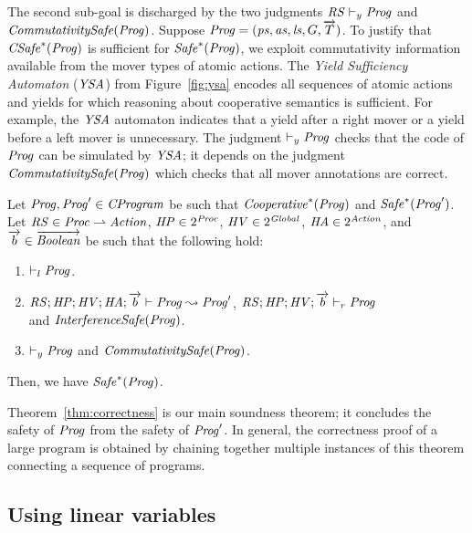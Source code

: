 The second sub-goal is discharged by the two judgments $\mathit{RS} \vdash_y \mathit{Prog}$ and $\mathit{CommutativitySafe}(\mathit{Prog})$.
Suppose $\mathit{Prog} = (\mathit{ps}, \mathit{as}, \mathit{ls}, G, \overrightarrow{T})$.
To justify that $\mathit{CSafe}^*(\mathit{Prog})$ is sufficient for $\mathit{Safe}^*(\mathit{Prog})$,
we exploit commutativity information available from the mover types of atomic actions.
The {\em Yield Sufficiency Automaton\/} ($\mathit{YSA}$) from Figure~\ref{fig:ysa} encodes 
all sequences of atomic actions and yields for which reasoning about cooperative semantics is sufficient.
For example, the $\mathit{YSA}$ automaton indicates that a yield after a right mover or a yield before a left mover is unnecessary.
The judgment $\vdash_y \mathit{Prog}$ checks that the code of $\mathit{Prog}$ can be simulated by $\mathit{YSA}$;
it depends on the judgment $\mathit{CommutativitySafe}(\mathit{Prog})$ which checks that all mover annotations are correct.

\begin{theorem}
\label{thm:correctness}
Let $\mathit{Prog},\mathit{Prog}' \in \mathit{CProgram}$ be such that $\mathit{Cooperative}^*(\mathit{Prog})$ and $\mathit{Safe}^*(\mathit{Prog}')$.
Let $\mathit{RS} \in \mathit{Proc} \rightharpoonup \mathit{Action}$, $\mathit{HP} \in 2^{\mathit{Proc}}$, 
$\mathit{HV} \in 2^{\mathit{Global}}$, $\mathit{HA} \in 2^{\mathit{Action}}$,
and $\overrightarrow{b} \in \overrightarrow{\mathit{Boolean}}$ be such that the following hold:
\begin{enumerate}
\item
$\vdash_l \mathit{Prog}$.
\item
$\mathit{RS};\mathit{HP};\mathit{HV};\mathit{HA};\overrightarrow{b} \vdash \mathit{Prog} \leadsto \mathit{Prog}'$,
$\mathit{RS};\mathit{HP};\mathit{HV};\overrightarrow{b} \vdash_r \mathit{Prog}$ \\ and $\mathit{InterferenceSafe}(\mathit{Prog})$.
\item
$\vdash_y \mathit{Prog}$ and $\mathit{CommutativitySafe}(\mathit{Prog})$.
\end{enumerate}
Then, we have $\mathit{Safe}^*(\mathit{Prog})$.
\end{theorem}

Theorem~\ref{thm:correctness} is our main soundness theorem;
it concludes the safety of $\mathit{Prog}$ from the safety of $\mathit{Prog}'$.
In general, the correctness proof of a large program is obtained by chaining together
multiple instances of this theorem connecting a sequence of programs.  

\subsection{Using linear variables}
\label{sec:linearity}

